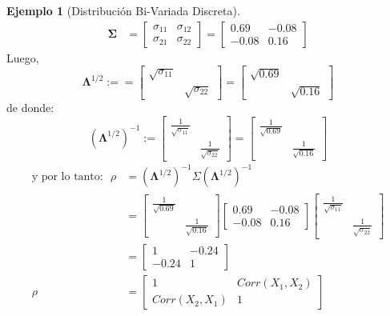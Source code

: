 \documentclass[
]{book}
\theoremstyle{definition}
\theoremstyle{definition}
\newtheorem{example}{Ejemplo}[chapter]
\theoremstyle{definition}
\theoremstyle{definition}
\theoremstyle{remark}
\begin{document}
\begin{example}[Distribución Bi-Variada Discreta]
\begin{align*}
\mathbf{\Sigma} &=\begin{bmatrix}
\sigma_{11} & \sigma_{12}\\
\sigma_{21} & \sigma_{22}
\end{bmatrix}=
\begin{bmatrix}
0.69 & -0.08 \\
-0.08 & 0.16
\end{bmatrix}
\end{align*}
Luego,
\[
\mathbf{\mathbf{\mathbf{\mathbf{\mathbf{\Lambda}}}}}^{1/2}:=
= \begin{bmatrix}
\sqrt{\sigma_{11}} &   \\
& \sqrt{\sigma_{22}}
\end{bmatrix}=\begin{bmatrix}
\sqrt{0.69} & \\
& \sqrt{0.16}
\end{bmatrix}
\]
de donde:
\[
  (\mathbf{\mathbf{\mathbf{\mathbf{\mathbf{\Lambda}}}}}^{1/2})^{-1}:=
  \begin{bmatrix}
\frac{1}{\sqrt{\sigma_{11}}} &   \\
& \frac{1}{\sqrt{\sigma_{22}}}
\end{bmatrix}=\begin{bmatrix}
\frac{1}{\sqrt{0.69}} & \\
& \frac{1}{\sqrt{0.16}}
\end{bmatrix}
\]
\begin{align*}
\text{y por lo tanto:}\ \ \  \rho &=(\mathbf{\mathbf{\mathbf{\mathbf{\mathbf{\Lambda}}}}}^{1/2})^{-1}\Sigma (\mathbf{\mathbf{\mathbf{\mathbf{\mathbf{\Lambda}}}}}^{1/2})^{-1}\\
&=\begin{bmatrix}
\frac{1}{\sqrt{0.69}} & \\
& \frac{1}{\sqrt{0.16}}
\end{bmatrix}\begin{bmatrix}
0.69 & -0.08 \\
-0.08 & 0.16
\end{bmatrix}
\begin{bmatrix}
\frac{1}{\sqrt{\sigma_{11}}} &   \\
& \frac{1}{\sqrt{\sigma_{22}}}
\end{bmatrix}\\
&=\begin{bmatrix}
1 & -0.24\\
-0.24  & 1
\end{bmatrix}\\
\rho&=\begin{bmatrix}
1 & Corr(X_1,X_2)\\
Corr(X_2,X_1) & 1
\end{bmatrix}
\end{align*}
\end{example}
\end{document}
